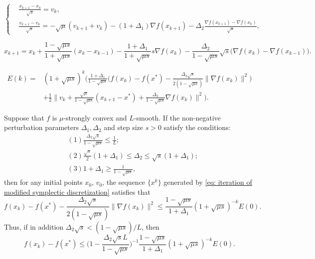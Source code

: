 \documentclass[10pt,a4paper]{amsart}
\begin{document}
\begin{equation}
    \label{strong disturb symplectic 2 iteration}
    \left\{
    \begin{aligned}
        &\frac{x_{k+1}-x_k}{\sqrt{s}}=v_k,\\
        &\frac{v_{k+1}-v_k}{\sqrt{s}}=-\sqrt{\mu}(v_{k+1}+v_k)-(1+\Delta_1)\nabla f(x_{k+1})-\Delta_2\frac{\nabla f(x_{k+1})-\nabla f(x_k)}{\sqrt{s}},
    \end{aligned}
    \right.
\end{equation}

\begin{equation}
    \label{eq: iteration of modified symplectic discretization}
    x_{k+1}=x_k+\frac{1-\sqrt{\mu s}}{1+\sqrt{\mu s}}(x_k-x_{k-1})-\frac{1+\Delta_1}{1+\sqrt{\mu s}}s\nabla f(x_{k})-\frac{\Delta_2}{1-\sqrt{\mu s}}\sqrt{s}\big(\nabla f(x_{k})-\nabla f(x_{k-1})\big).
\end{equation}

\begin{equation}
	\label{Lyapunov for symplectic 2 slow}
	\begin{aligned}
		E(k)=&(1+\sqrt{\mu s})^k\big(\frac{1+\Delta_1}{1-\sqrt{\mu s}}\big(f(x_k)-f(x^*)-\frac{\Delta_2\sqrt{s}}{2(1-\sqrt{\mu s})}\|\nabla f(x_k)\|^2\big)\\
		&+\frac{1}{2}\|v_k+\frac{\sqrt{\mu}}{1-\sqrt{\mu s}}(x_{k+1}-x^*)+\frac{\Delta_2}{1-\sqrt{\mu s}}\nabla f(x_k)\|^2\big).
	\end{aligned}
\end{equation}

\begin{THM}
	\label{th:modified symplectic 2 slow}
	Suppose that $f$ is $\mu$-strongly convex and $L$-smooth. If the non-negative perturbation
	parameters $\Delta_1, \Delta_2$ and step size $s>0$ satisfy the conditions:
	\begin{equation}
		\label{conditions of modified symplectic 2 slow}
		\begin{aligned}
			&\, (1)\frac{\Delta_2\sqrt{s}}{1-\sqrt{\mu s}}\leqslant \frac{1}{L};\\
			&\, (2)\frac{\sqrt{s}}{2}(1+\Delta_1)\leqslant \Delta_2\leqslant \sqrt{s}(1+\Delta_1);\\
			&\, (3) 1+\Delta_1 \geqslant \frac{1}{1-\sqrt{\mu s}},
		\end{aligned}
	\end{equation}
	then for any initial points $x_0$, $v_0$, the sequence $\{x^k\}$ generated by \eqref{eq: iteration of modified symplectic discretization} satisfies that
	\begin{equation*}
		f(x_k)-f(x^*)-\frac{\Delta_2\sqrt{s}}{2(1-\sqrt{\mu s})}\|\nabla f(x_k)\|^2 \leqslant \frac{1-\sqrt{\mu s}}{1+\Delta_1}(1+\sqrt{\mu s})^{-k}E(0).
	\end{equation*}
	Thus, if in addition $\Delta_2\sqrt{s}<(1-\sqrt{\mu s})/L$, then
	\begin{equation}
		f(x_k)-f(x^*) \leqslant \Big(1-\frac{\Delta_2\sqrt{s}L}{1-\sqrt{\mu s}}\Big)^{-1}\frac{1-\sqrt{\mu s}}{1+\Delta_1}(1+\sqrt{\mu s})^{-k}E(0).
	\end{equation}
\end{THM}
\end{document}

